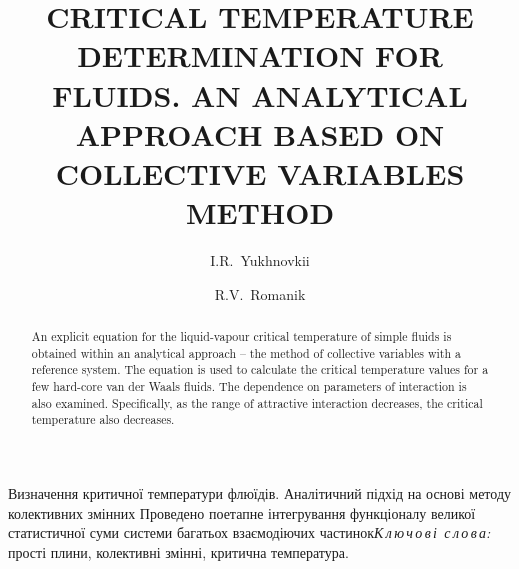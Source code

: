 \documentclass[fleqn,twoside,twocolumn,nofootinbib,showkeys]{revtex4} %
\begin{document}
\title[Critical temperature determination for fluids]%
{CRITICAL TEMPERATURE DETERMINATION FOR FLUIDS. AN ANALYTICAL APPROACH BASED ON COLLECTIVE VARIABLES METHOD}%
\author{I.R.~Yukhnovkii}%
\author{R.V.~Romanik}
\address{1, Svientsitskii Str., Lviv 79011, Ukraine}%


  \razd{\secvii}



\setcounter{page}{53}

\begin{abstract}
An explicit equation for the liquid-vapour critical temperature of simple fluids is obtained within an analytical approach -- the method of collective variables with a reference system.
The equation is used to calculate the critical temperature values for a few hard-core van der Waals fluids. The dependence on parameters of interaction is also examined. Specifically, as the range of attractive interaction decreases, the critical temperature also decreases.
\end{abstract}


\maketitle











\appendix

\renewcommand{\theequation}{A.\arabic{equation}}
\setcounter{equation}{0}





\vskip3mm \textit{}

%


\vspace*{-5mm}  {Визначення критичної температури флюїдів. Аналітичний підхід на основі методу колективних змінних} {Проведено поетапне інтегрування функціоналу великої статистичної суми системи багатьох взаємодіючих частинок}{\textit{К\,л\,ю\,ч\,о\,в\,і\,
с\,л\,о\,в\,а:} прості плини, колективні змінні, критична температура.}
\end{document}
